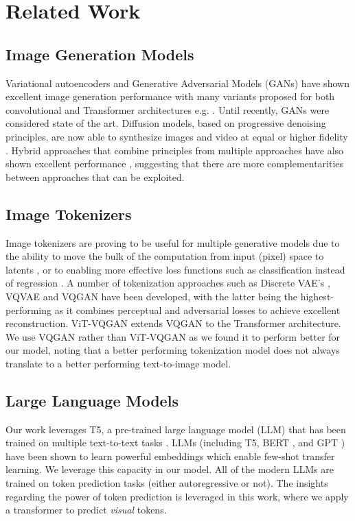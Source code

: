 \section{Related Work}
\subsection{Image Generation Models} 
Variational autoencoders \citep{vqvae} and Generative Adversarial Models (GANs) have shown excellent image generation performance with many variants proposed for both convolutional and Transformer architectures e.g. \citep{goodfellow2020generative,esser2021taming,karras2019style,brock2018large,donahue2019large}. Until recently, GANs were considered state of the art. Diffusion models, based on progressive denoising principles, are now able to synthesize images and video at equal or higher fidelity \citep{ddpm,kingma2021variational,ho2022video}. Hybrid approaches that combine principles from multiple approaches have also shown excellent performance \citep{maskgit,lezama2022improved}, suggesting that there are more complementarities between approaches that can be exploited.

\subsection{Image Tokenizers}
Image tokenizers are proving to be useful for multiple generative models due to the ability to move the bulk of the computation from input (pixel) space to latents \citep{ldm}, or to enabling more effective loss functions such as classification instead of regression \citep{maskgit,lezama2022improved,li2022mage}. A number of tokenization approaches such as Discrete VAE's \citep{rolfe2016discrete}, VQVAE \citep{vqvae} and VQGAN \citep{esser2021taming} have been developed, with the latter being the highest-performing as it combines perceptual and adversarial losses to achieve excellent reconstruction. ViT-VQGAN \citep{yu2021vector} extends VQGAN to the Transformer architecture. We use VQGAN rather than ViT-VQGAN as we found it to perform better for our model, noting that a better performing tokenization model does not always translate to a better performing text-to-image model.

\subsection{Large Language Models}
Our work leverages T5, a pre-trained large language model (LLM) that has been trained on multiple text-to-text tasks \citep{t5xxl}. LLMs (including T5, BERT \citep{bert}, and GPT \citep{brown2020language,radford2019language}) have been shown to learn powerful embeddings which enable few-shot transfer learning. We leverage this capacity in our model. All of the modern LLMs are trained on token prediction tasks (either autoregressive or not). The insights regarding the power of token prediction is leveraged in this work, where we apply a transformer to predict \emph{visual} tokens.

